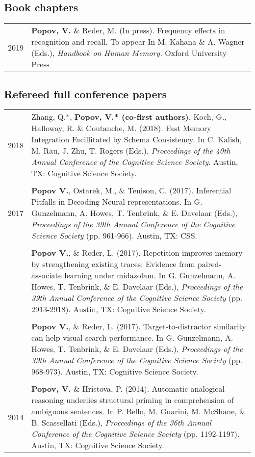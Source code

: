 \documentclass[letterpaper]{article}
\begin{document}
\subsection*{Book chapters}

\begin{longtable}{p{0.7cm}p{15cm}}
2019 & \textbf{Popov, V.} \& Reder, M. (In press). Frequency effects in recognition and recall. To appear In M. Kahana \& A. Wagner (Eds.), {\it Handbook on Human Memory.} Oxford University Press
\end{longtable}

\subsection*{Refereed full conference papers}

\begin{longtable}{p{0.7cm}p{15cm}}
2018  &  Zhang, Q.*, \textbf{Popov, V.* (co-first authors)}, Koch, G., Halloway, R. \& Coutanche, M. (2018). Fast Memory Integration Facillitated by Schema Consistency. In C. Kalish, M. Rau, J. Zhu, T. Rogers (Eds.), {\it Proceedings of the 40th Annual Conference of the Cognitive Science Society}. Austin, TX: Cognitive Science Society.\\[6pt]
&\\
2017 & \textbf{Popov V.}, Ostarek, M., \& Tenison, C. (2017). Inferential Pitfalls in Decoding Neural representations. In G. Gunzelmann, A. Howes, T. Tenbrink, \& E. Davelaar (Eds.), {\it Proceedings of the 39th Annual Conference of the Cognitive Science Society} (pp. 961-966). Austin, TX: CSS.\\[6pt]
 &\\
& \textbf{Popov V.}, \& Reder, L. (2017). Repetition improves memory by strengthening existing traces: Evidence from paired-associate learning under midazolam. In G. Gunzelmann, A. Howes, T. Tenbrink, \& E. Davelaar (Eds.), {\it Proceedings of the 39th Annual Conference of the Cognitive Science Society} (pp. 2913-2918). Austin, TX: Cognitive Science Society.\\[6pt]
 &\\
& \textbf{Popov V.}, \& Reder, L. (2017). Target-to-distractor similarity can help visual search performance. In G. Gunzelmann, A. Howes, T. Tenbrink, \& E. Davelaar (Eds.), {\it Proceedings of the 39th Annual Conference of the Cognitive Science Society} (pp. 968-973). Austin, TX: Cognitive Science Society.\\[6pt]
 &\\
2014 & \textbf{Popov, V.} \& Hristova, P. (2014). Automatic analogical reasoning underlies structural priming in comprehension of ambiguous sentences. In P. Bello, M. Guarini, M. McShane, \& B. Scassellati (Eds.), {\it Proceedings of the 36th Annual Conference of the Cognitive Science Society} (pp. 1192-1197). Austin, TX: Cognitive Science Society.\\[6pt]

\end{longtable}
\end{document}
